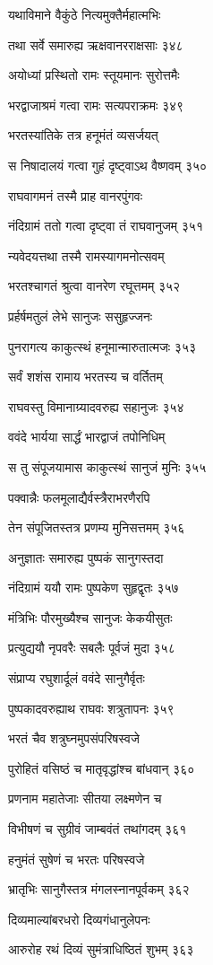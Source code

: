 यथाविमाने वैकुंठे नित्यमुक्तैर्महात्मभिः

तथा सर्वे समारुह्य ऋक्षवानरराक्षसाः ३४८

अयोध्यां प्रस्थितो रामः स्तूयमानः सुरोत्तमैः

भरद्वाजाश्रमं गत्वा रामः सत्यपराक्रमः ३४९

भरतस्यांतिके तत्र हनूमंतं व्यसर्जयत्

स निषादालयं गत्वा गुहं दृष्ट्वाऽथ वैष्णवम् ३५०

राघवागमनं तस्मै प्राह वानरपुंगवः

नंदिग्रामं ततो गत्वा दृष्ट्वा तं राघवानुजम् ३५१

न्यवेदयत्तथा तस्मै रामस्यागमनोत्सवम्

भरतश्चागतं श्रुत्वा वानरेण रघूत्तमम् ३५२

प्रर्हर्षमतुलं लेभे सानुजः ससुहृज्जनः

पुनरागत्य काकुत्स्थं हनूमान्मारुतात्मजः ३५३

सर्वं शशंस रामाय भरतस्य च वर्तितम्

राघवस्तु विमानाग्र्यादवरुह्य सहानुजः ३५४

ववंदे भार्यया सार्द्धं भारद्वाजं तपोनिधिम्

स तु संपूजयामास काकुत्स्थं सानुजं मुनिः ३५५

पक्वान्नैः फलमूलाद्यैर्वस्त्रैराभरणैरपि

तेन संपूजितस्तत्र प्रणम्य मुनिसत्तमम् ३५६

अनुज्ञातः समारुह्य पुष्पकं सानुगस्तदा

नंदिग्रामं ययौ रामः पुष्पकेण सुहृद्वृतः ३५७

मंत्रिभिः पौरमुख्यैश्च सानुजः केकयीसुतः

प्रत्युद्ययौ नृपवरैः सबलैः पूर्वजं मुदा ३५८

संप्राप्य रघुशार्दूलं ववंदे सानुगैर्वृतः

पुष्पकादवरुह्याथ राघवः शत्रुतापनः ३५९

भरतं चैव शत्रुघ्नमुपसंपरिषस्वजे

पुरोहितं वसिष्ठं च मातृवृद्धांश्च बांधवान् ३६०

प्रणनाम महातेजाः सीतया लक्ष्मणेन च

विभीषणं च सुग्रीवं जाम्बवंतं तथांगदम् ३६१

हनुमंतं सुषेणं च भरतः परिषस्वजे

भ्रातृभिः सानुगैस्तत्र मंगलस्नानपूर्वकम् ३६२

दिव्यमाल्यांबरधरो दिव्यगंधानुलेपनः

आरुरोह रथं दिव्यं सुमंत्राधिष्ठितं शुभम् ३६३

